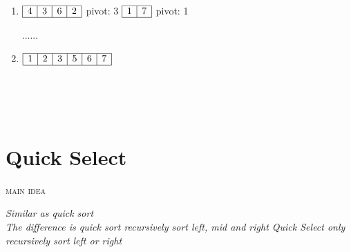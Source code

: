 \documentclass[12pt, letterpaper]{article}
\newcommand{\idea}[1]{
\noindent
\begin{minipage}[t]{0.15\textwidth}
	\textsc{main idea}
\end{minipage}
\hspace{-0.8cm}\vline\hspace{0.05cm}
\begin{minipage}[t]{0.88\textwidth}
	\textit{#1}
\end{minipage}\vspace{0.25cm}}
\begin{document}
\begin{minipage}{0.8\textwidth}
\begin{enumerate}
		\item
		$\begin{array}{|l|c|c|r|}
			\hline
			4 & 3 & 6 & 2\\
			\hline
		\end{array}$
		pivot: 3
		$\begin{array}{|l|r|}
			\hline
			1 & 7\\
			\hline
		\end{array}$
		pivot: 1
		
		......
		
		\item
		$\begin{array}{|l|c|c|c|c|r|}
			\hline
			1 & 2 & 3 & 5 & 6 & 7 \\
			\hline
		\end{array}$
	\end{enumerate}
\end{minipage}\\\\\\

\section{Quick Select}
\idea{Similar as quick sort\\
	  The difference is quick sort recursively sort left, mid and right
	  Quick Select only recursively sort left or right}
\end{document}

